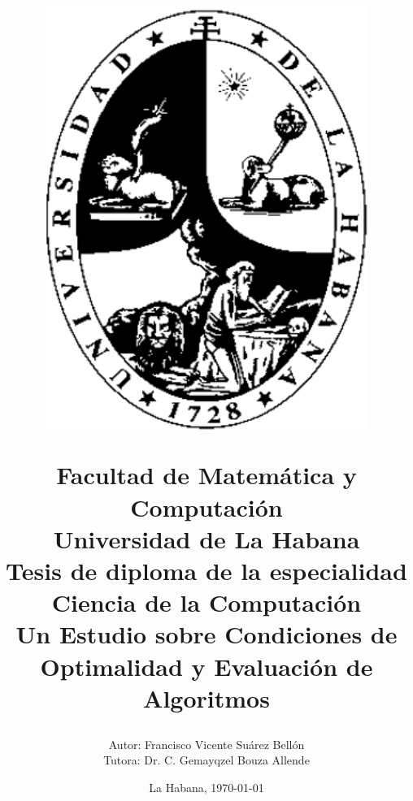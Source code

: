 \begin{titlepage}
	
	\title{\vspace*{-70pt}
		\begin{figure}
			\includegraphics[scale=0.2]{img/logo.png}
		\end{figure} 
		\vspace*{10pt}Facultad de Matemática y Computación \\
		Universidad de La Habana \\
		\vspace*{20pt}	
		Tesis de diploma de la especialidad \\ 
		Ciencia de la Computación \\
		
		\vspace*{20pt}
		Un Estudio sobre
		Condiciones de Optimalidad y Evaluación de
		Algoritmos %
		\vspace*{-35pt}
		\author{{\large Autor: Francisco Vicente Suárez Bellón \vspace*{15pt}} \\
			{\large Tutora: Dr. C. Gemayqzel Bouza Allende} \\ \hspace{10pt}  }
		
		\date{La Habana, \today}
	}
	
\end{titlepage}